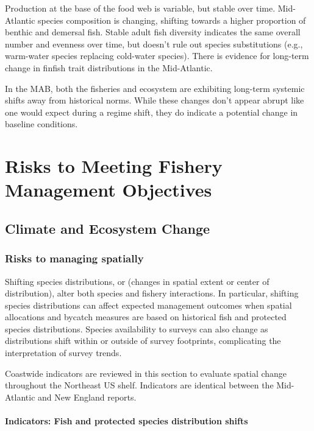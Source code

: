 \documentclass[
  10pt,
]{article}
\begin{document}
Production at the base of the food web is variable, but stable over
time. Mid-Atlantic species composition is changing, shifting towards a
higher proportion of benthic and demersal fish. Stable adult fish
diversity indicates the same overall number and evenness over time, but
doesn't rule out species substitutions (e.g., warm-water species
replacing cold-water species). There is evidence for long-term change in
finfish trait distributions in the Mid-Atlantic.

In the MAB, both the fisheries and ecosystem are exhibiting long-term
systemic shifts away from historical norms. While these changes don't
appear abrupt like one would expect during a regime shift, they do
indicate a potential change in baseline conditions.

\section{Risks to Meeting Fishery Management
Objectives}\label{risks-to-meeting-fishery-management-objectives}

\subsection{Climate and Ecosystem
Change}\label{climate-and-ecosystem-change}

\subsubsection{Risks to managing
spatially}\label{risks-to-managing-spatially}

Shifting species distributions, or (changes in spatial extent or center
of distribution), alter both species and fishery interactions. In
particular, shifting species distributions can affect expected
management outcomes when spatial allocations and bycatch measures are
based on historical fish and protected species distributions. Species
availability to surveys can also change as distributions shift within or
outside of survey footprints, complicating the interpretation of survey
trends.

Coastwide indicators are reviewed in this section to evaluate spatial
change throughout the Northeast US shelf. Indicators are identical
between the Mid-Atlantic and New England reports.

\paragraph{Indicators: Fish and protected species distribution
shifts}\label{indicators-fish-and-protected-species-distribution-shifts}
\end{document}
